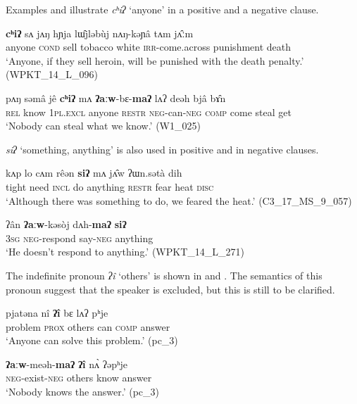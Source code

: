 \documentclass[output=paper,colorlinks,citecolor=brown]{langscibook}
\begin{document}
Examples  and  illustrate \textit{cʰiʔ} ‘anyone’ in a positive and a negative clause.

\ea\label{ex:rum:60}
    \gll \textbf{cʰiʔ}	sʌ	jʌŋ	hɲja	lɯ̂jləbùj	nʌŋ-kəɲâ	tʌm	jʌ̂ːm \\
         anyone \textsc{cond} sell tobacco white \textsc{irr}{}-come.across punishment death \\
    \glt ‘Anyone, if they sell heroin, will be punished with the death penalty.’ (WPKT\_14\_L\_096)
\z 

\ea\label{ex:rum:61}
    \gll pʌŋ	səmâ	jê	\textbf{cʰiʔ}	mʌ	\textbf{ʔaːw}-bɛ-\textbf{maʔ}	lʌʔ	deəh	bjâ	bɤ̂n \\
         \textsc{rel} know \textsc{1pl.excl} anyone \textsc{restr} \textsc{neg}{}-can{}-\textsc{neg} \textsc{comp} come steal get \\
    \glt ‘Nobody can steal what we know.’ (W1\_025)
\z 

\textit{siʔ} ‘something, anything’ is also used in positive  and in negative  clauses.

\ea\label{ex:rum:62}
    \gll kʌp	lo	cʌm	rêən	\textbf{siʔ}	mʌ	jʌ̂w	ʔɯn.sətà	dih \\
         tight need \textsc{incl} do anything \textsc{restr} fear heat \textsc{disc} \\
    \glt ‘Although there was something to do, we feared the heat.’ (C3\_17\_MS\_9\_057)
\z 

\ea\label{ex:rum:63}
    \gll ʔân	\textbf{ʔaːw}-kəsòj	dʌh-\textbf{maʔ}	\textbf{siʔ} \\
         3\textsc{sg} \textsc{neg}{}-respond say-\textsc{neg} anything \\
    \glt ‘He doesn’t respond to anything.’ (WPKT\_14\_L\_271)
\z

The indefinite pronoun \textit{ʔî} ‘others’ is shown in  and . The semantics of this pronoun suggest that the speaker is excluded, but this is still to be clarified.

\ea\label{ex:rum:64}
    \gll pjatəna	nî	\textbf{ʔî}	bɛ	lʌʔ	pʰje\\
         problem \textsc{prox} others can \textsc{comp} answer \\
    \glt ‘Anyone can solve this problem.’ (pc\_3)
\z 

\ea\label{ex:rum:65}
    \gll \textbf{ʔaːw}-meəh-\textbf{maʔ}	\textbf{ʔî}	nʌ̀	ʔəpʰje \\
         \textsc{neg}{}-exist-\textsc{neg} others know answer \\
    \glt ‘Nobody knows the answer.’ (pc\_3)
\z 
\end{document}
